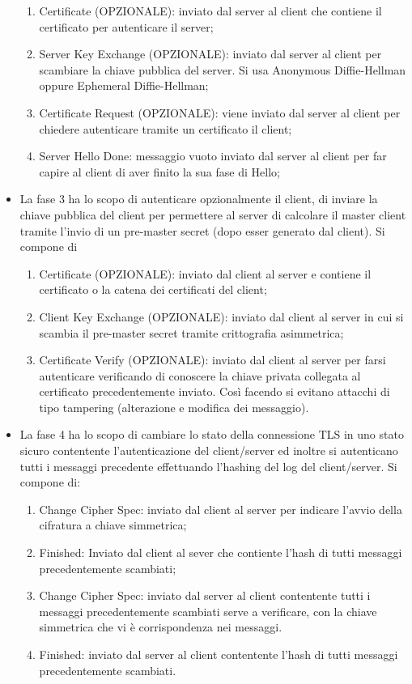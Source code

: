 \documentclass[a4paper,draft]{article}
\begin{document}
\begin{itemize}
\begin{enumerate}
        \item Certificate (OPZIONALE): inviato dal server al client che contiene il certificato per autenticare il server;
        \item Server Key Exchange (OPZIONALE): inviato dal server al client per scambiare la chiave pubblica del server\@. Si usa Anonymous Diffie-Hellman oppure Ephemeral Diffie-Hellman;
        \item Certificate Request (OPZIONALE): viene inviato dal server al client per chiedere autenticare tramite un certificato il client;
        \item Server Hello Done: messaggio vuoto inviato dal server al client per far capire al client di aver finito la sua fase di Hello;
    \end{enumerate}
    \item La fase 3 ha lo scopo di autenticare opzionalmente il client, di inviare la chiave pubblica del client per permettere al server di calcolare il master client tramite l'invio di un pre-master secret (dopo esser generato dal client)\@. Si compone di \begin{enumerate}
        \item Certificate (OPZIONALE): inviato dal client al server e contiene il certificato o la catena dei certificati del client;
        \item Client Key Exchange (OPZIONALE): inviato dal client al server in cui si scambia il pre-master secret tramite crittografia asimmetrica;
        \item Certificate Verify (OPZIONALE): inviato dal client al server per farsi autenticare verificando di conoscere la chiave privata collegata al certificato precedentemente inviato\@. Così facendo si evitano attacchi di tipo tampering (alterazione e modifica dei messaggio).
    \end{enumerate}
    \item La fase 4 ha lo scopo di cambiare lo stato della connessione TLS in uno stato sicuro contentente l'autenticazione del client/server ed inoltre si autenticano tutti i messaggi precedente effettuando l'hashing del log del client/server\@. Si compone di:\begin{enumerate}
        \item Change Cipher Spec: inviato dal client al server per indicare l'avvio della cifratura a chiave simmetrica;
        \item Finished: Inviato dal client al sever che contiente l'hash di tutti messaggi precedentemente scambiati;
        \item Change Cipher Spec: inviato dal server al client contentente tutti i messaggi precedentemente scambiati serve a verificare, con la chiave simmetrica che vi è corrispondenza nei messaggi.
        \item Finished: inviato dal server al client contentente l'hash di tutti messaggi precedentemente scambiati.
    \end{enumerate}
\end{itemize}
\end{document}
